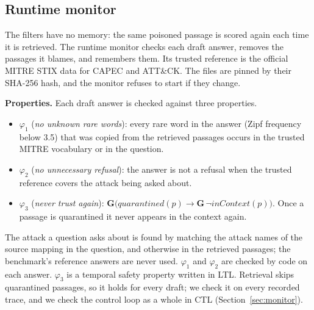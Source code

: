 \documentclass[10pt,journal,compsoc]{IEEEtran}
\begin{document}
\subsection{Runtime monitor}\label{sec:monitor-design}
The filters have no memory: the same poisoned passage is scored again each time it is retrieved. The runtime monitor checks each draft answer, removes the passages it blames, and remembers them. Its trusted reference is the official MITRE STIX data for CAPEC and ATT\&CK. The files are pinned by their SHA-256 hash, and the monitor refuses to start if they change.

\textbf{Properties.} Each draft answer is checked against three properties.
\begin{itemize}
\item $\varphi_1$ (\emph{no unknown rare words}): every rare word in the answer (Zipf frequency below 3.5) that was copied from the retrieved passages occurs in the trusted MITRE vocabulary or in the question.
\item $\varphi_2$ (\emph{no unnecessary refusal}): the answer is not a refusal when the trusted reference covers the attack being asked about.
\item $\varphi_3$ (\emph{never trust again}): $\mathbf{G}\big(\mathit{quarantined}(p)\rightarrow\mathbf{G}\,\neg\mathit{inContext}(p)\big)$. Once a passage is quarantined it never appears in the context again.
\end{itemize}
The attack a question asks about is found by matching the attack names of the source mapping in the question, and otherwise in the retrieved passages; the benchmark's reference answers are never used. $\varphi_1$ and $\varphi_2$ are checked by code on each answer. $\varphi_3$ is a temporal safety property written in LTL. Retrieval skips quarantined passages, so it holds for every draft; we check it on every recorded trace, and we check the control loop as a whole in CTL (Section~\ref{sec:monitor}).
\end{document}
